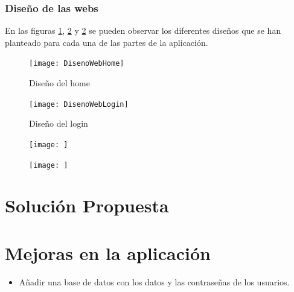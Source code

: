 \documentclass[a4paper]{report}
\begin{document}
	\subsection{Diseño de las webs}
	En las figuras \ref{home}, \ref{login} y \ref{} se pueden observar los diferentes diseños que se han planteado para cada una de las partes de la aplicación.
	\begin{figure}
		\texttt{[image: DisenoWebHome]}
		\caption{Diseño del home}
		\label{home}
	\end{figure}
	\begin{figure}
		\texttt{[image: DisenoWebLogin]}
		\caption{Diseño del login}
		\label{login}
	\end{figure}
	\begin{figure}
		\texttt{[image: ]}
		\caption{}
		\label{}
	\end{figure}
	\begin{figure}
		\texttt{[image: ]}
		\caption{}
		\label{}
	\end{figure}
	
	\chapter{Solución Propuesta}
	
	
	\chapter{Mejoras en la aplicación}
	
	\begin{itemize}
		\item Añadir una base de datos con los datos y las contraseñas de los usuarios.
		
	\end{itemize}
	
\end{document}
